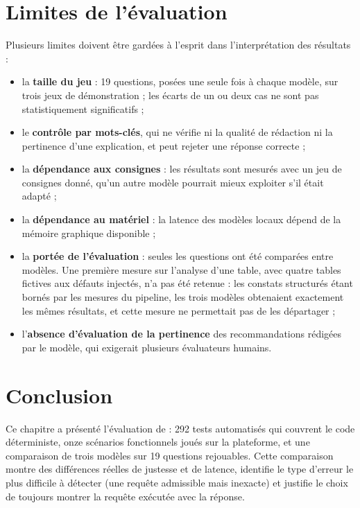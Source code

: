 \section{Limites de l'évaluation}

Plusieurs limites doivent être gardées à l'esprit dans l'interprétation des résultats :
\begin{itemize}
  \item la \textbf{taille du jeu} : 19 questions, posées une seule fois à chaque modèle, sur trois jeux de démonstration ; les écarts de un ou deux cas ne sont pas statistiquement significatifs ;
  \item le \textbf{contrôle par mots-clés}, qui ne vérifie ni la qualité de rédaction ni la pertinence d'une explication, et peut rejeter une réponse correcte ;
  \item la \textbf{dépendance aux consignes} : les résultats sont mesurés avec un jeu de consignes donné, qu'un autre modèle pourrait mieux exploiter s'il était adapté ;
  \item la \textbf{dépendance au matériel} : la latence des modèles locaux dépend de la mémoire graphique disponible ;
  \item la \textbf{portée de l'évaluation} : seules les questions ont été comparées entre modèles. Une première mesure sur l'analyse d'une table, avec quatre tables fictives aux défauts injectés, n'a pas été retenue : les constats structurés étant bornés par les mesures du pipeline, les trois modèles obtenaient exactement les mêmes résultats, et cette mesure ne permettait pas de les départager ;
  \item l'\textbf{absence d'évaluation de la pertinence} des recommandations rédigées par le modèle, qui exigerait plusieurs évaluateurs humains.
\end{itemize}

\section*{Conclusion}
Ce chapitre a présenté l'évaluation de \projet{} : 292 tests automatisés qui couvrent le code déterministe, onze scénarios fonctionnels joués sur la plateforme, et une comparaison de trois modèles sur 19 questions rejouables. Cette comparaison montre des différences réelles de justesse et de latence, identifie le type d'erreur le plus difficile à détecter (une requête admissible mais inexacte) et justifie le choix de toujours montrer la requête exécutée avec la réponse.
